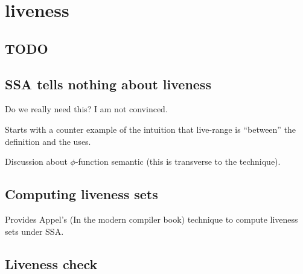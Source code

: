 \chapter{liveness }
\section{TODO}

\section{SSA tells nothing about liveness}
Do we really need this? I am not convinced.

Starts with a counter example of the intuition that live-range is ``between'' the definition and the uses. 

Discussion about $\phi$-function semantic (this is transverse to the technique).

\section{Computing liveness sets}
Provides Appel's (In the modern compiler book) technique to compute liveness sets under SSA.

\section{Liveness check}
